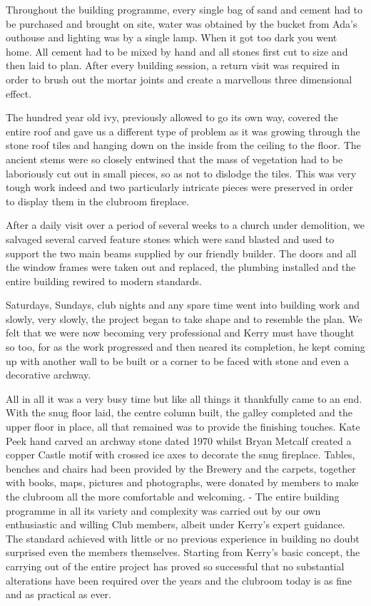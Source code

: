 \documentclass[a5paper,openany,font 10pt]{scrbook}
\begin{document}
Throughout the building programme, every single bag of sand
and cement had to be purchased and  brought on site, water was
obtained by the bucket from Ada's outhouse and lighting was by a
single lamp. When it got too dark you went home. All cement had
to be mixed by hand and all stones first cut to size and then
laid to plan. After every building session, a return visit was
required in order to brush out the mortar joints and create a
marvellous three dimensional effect.

The hundred year old ivy, previously allowed to go its own
way, covered the entire roof and gave us a different type of
problem as it was growing through the stone roof tiles and
hanging down on the inside from the ceiling to the floor. The
ancient stems were so closely entwined that the mass of
vegetation had to be laboriously cut out in small pieces, so as
not to dislodge the tiles. This was very tough work indeed and
two particularly intricate pieces were preserved in order to
display them in the clubroom fireplace.

After a daily visit over a period of several weeks to a
church under demolition, we salvaged several carved feature
stones which were sand blasted and used to support the two main
beams supplied by our friendly builder. The doors and all the
window frames were taken out and replaced, the plumbing installed
and the entire building rewired to modern standards.

Saturdays, Sundays, club nights and any spare time went into
building work and slowly, very slowly, the project began to take
shape and to resemble the plan. We felt that we were now becoming
very professional and Kerry must have thought so too, for as the
work progressed and then neared its completion, he kept coming up
with another wall to be built or a corner to be faced with stone
and even a decorative archway.

All in all it was a very busy time but like all things it
thankfully came to an end. With the snug floor laid, the centre
column built, the galley completed and the upper floor in place,
all that remained was to provide the finishing touches. Kate Peek
hand carved an archway stone dated 1970 whilst Bryan Metcalf
created a copper Castle motif with crossed ice axes to decorate
the snug fireplace. Tables, benches and chairs had been provided
by the Brewery and the carpets, together with books, maps,
pictures and photographs, were donated by members to make the
clubroom all the more comfortable and welcoming. -
The entire building programme in all its variety and
complexity was carried out by our own enthusiastic and willing
Club members, albeit under Kerry's expert guidance. The standard
achieved with little or no previous experience in building no
doubt surprised even the members themselves. Starting from
Kerry's basic concept, the carrying out of the entire project has
proved so successful that no substantial alterations have been
required over the years and the clubroom today is as fine and as
practical as ever.
\end{document}
